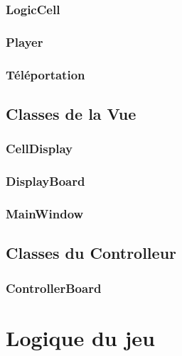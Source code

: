 \documentclass[utf8]{article}
\begin{document}
\begin{large}
\subsubsection{LogicCell}
\par
\indent
\par
\subsubsection{Player}
\par
\indent
\par
\subsubsection{Téléportation}
\par
\indent
\par

\subsection{Classes de la Vue}
\subsubsection{CellDisplay}
\par
\indent
\par
\subsubsection{DisplayBoard}
\par
\indent
\par
\subsubsection{MainWindow}
\par
\indent
\par

\subsection{Classes du Controlleur}
\subsubsection{ControllerBoard}
\par
\indent
\par

\par
\section{Logique du jeu}
\par
\indent
\par

\end{large}
\end{document}
